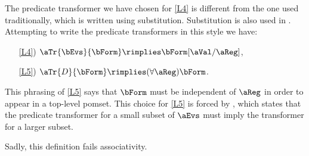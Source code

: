 \begin{example}
  \label{ex:skolem}
  The predicate transformer we have chosen for \ref{L4} is different from the
  one used traditionally, which is written using substitution.  Substitution
  is also used in \jjr{}.  Attempting to
  write the predicate transformers in this style we have:
  \begin{enumerate}[topsep=0pt]
  \item[\ref{L4})]
    $\aTr{\bEvs}{\bForm} \rimplies \bForm[\aVal/\aReg]$, 
  \item[\ref{L5})]
    $\aTr{\cEvs}{\bForm} \rimplies (\forall\aReg)\bForm$.
  \end{enumerate}
  This phrasing of \ref{L5} says that $\bForm$ must be independent of $\aReg$
  in order to appear in a top-level pomset.  This choice for \ref{L5} is forced
  by , which states that the predicate transformer for a
  small subset of $\aEvs$ must imply the transformer for a larger subset.

  Sadly, this definition fails associativity.


\end{example}

